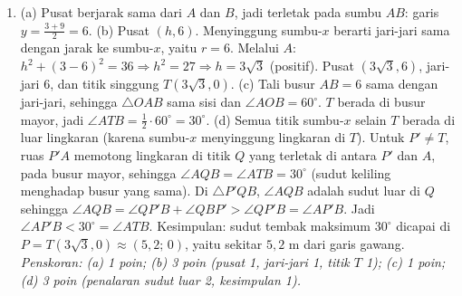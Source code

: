 \documentclass[a4paper,11pt]{article}
\begin{document}
\begin{enumerate}[leftmargin=2em,itemsep=3pt,topsep=2pt]
\item[\textbf{5.}] (a) Pusat berjarak sama dari $A$ dan $B$, jadi terletak pada sumbu $AB$: garis $y=\frac{3+9}{2}=6$. (b) Pusat $(h,6)$. Menyinggung sumbu-$x$ berarti jari-jari sama dengan jarak ke sumbu-$x$, yaitu $r=6$. Melalui $A$: $h^2+(3-6)^2=36\Rightarrow h^2=27\Rightarrow h=3\sqrt3$ (positif). Pusat $(3\sqrt3,6)$, jari-jari $6$, dan titik singgung $T(3\sqrt3,0)$. (c) Tali busur $AB=6$ sama dengan jari-jari, sehingga $\triangle OAB$ sama sisi dan $\angle AOB=60^\circ$. $T$ berada di busur mayor, jadi $\angle ATB=\frac12\cdot60^\circ=30^\circ$. (d) Semua titik sumbu-$x$ selain $T$ berada di luar lingkaran (karena sumbu-$x$ menyinggung lingkaran di $T$). Untuk $P'\neq T$, ruas $P'A$ memotong lingkaran di titik $Q$ yang terletak di antara $P'$ dan $A$, pada busur mayor, sehingga $\angle AQB=\angle ATB=30^\circ$ (sudut keliling menghadap busur yang sama). Di $\triangle P'QB$, $\angle AQB$ adalah sudut luar di $Q$ sehingga $\angle AQB=\angle QP'B+\angle QBP'>\angle QP'B=\angle AP'B$. Jadi $\angle AP'B<30^\circ=\angle ATB$. Kesimpulan: sudut tembak maksimum $30^\circ$ dicapai di $P=T(3\sqrt3,0)\approx(5{,}2;\,0)$, yaitu sekitar $5{,}2$ m dari garis gawang. \\ \textit{Penskoran: (a) 1 poin; (b) 3 poin (pusat 1, jari-jari 1, titik $T$ 1); (c) 1 poin; (d) 3 poin (penalaran sudut luar 2, kesimpulan 1).}
\end{enumerate}
\end{document}
